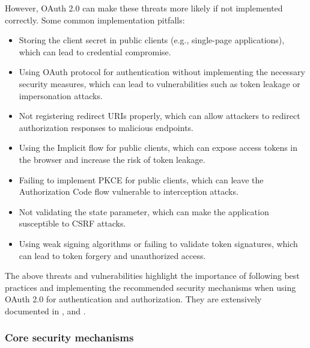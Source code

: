 \documentclass[../memoire.tex]{subfiles}
\begin{document}
However, OAuth 2.0 can make these threats more likely if not implemented correctly. Some common implementation pitfalls:
\begin{itemize}
  \item Storing the client secret in public clients (e.g., single-page applications), which can lead to credential compromise.
  \item Using OAuth protocol for authentication without implementing the necessary security measures, which can lead to vulnerabilities such as token leakage or impersonation attacks.
  \item Not registering redirect URIs properly, which can allow attackers to redirect authorization responses to malicious endpoints.
  \item Using the Implicit flow for public clients, which can expose access tokens in the browser and increase the risk of token leakage.
  \item Failing to implement PKCE for public clients, which can leave the Authorization Code flow vulnerable to interception attacks.
  \item Not validating the state parameter, which can make the application susceptible to CSRF attacks.
  \item Using weak signing algorithms or failing to validate token signatures, which can lead to token forgery and unauthorized access.
\end{itemize}

The above threats and vulnerabilities highlight the importance of following best practices and implementing the recommended security mechanisms when using OAuth 2.0 for authentication and authorization. They are extensively documented in \cite[p.~121]{richer2017}, \cite{rfc9700} and \cite{rfc6749}.

\subsubsection*{Core security mechanisms}
\end{document}
